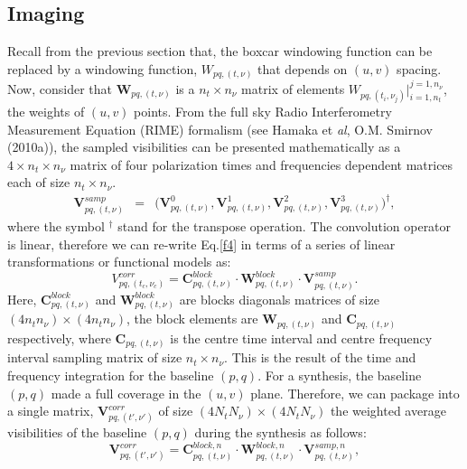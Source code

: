 \documentclass[useAMS,usenatbib]{mn2e}
\begin{document}
\subsection{Imaging}
\label{sec:imaging}
Recall from the previous section that, the boxcar windowing function can be replaced by a windowing function, $W_{pq,(t,\nu)}$ that depends 
on $(u,v)$ spacing. Now, consider that $\mathcal{\textbf{W}}_{pq,(t,\nu)}$ is a $n_t \times n_{\nu}$ matrix of elements 
$W_{pq,(t_i,\nu_j)}|_{i=1,n_t}^{j=1, n_{\nu}}$, the weights of $(u,v)$ points. From the full sky Radio Interferometry Measurement Equation 
(RIME) formalism (see Hamaka et \textit{al}, O.M. Smirnov (2010a)), the sampled visibilities can be presented mathematically as a $4\times 
n_t\times n_{\nu}$ matrix of four polarization times and 
frequencies dependent matrices each of size $n_t\times n_{\nu}$.
\begin{eqnarray*}
\mathbf{V}_{pq,(t,\nu)}^{samp}&=&\Bigg(\mathbf{V}_{pq,(t,\nu)}^{0},\mathbf { V } 
^1_{pq,(t,\nu)},\mathbf{V}^2_{pq,(t,\nu)},\mathbf{V}_{pq,(t,\nu)}^{3 } \Bigg)^{\dagger}, \label{eqx:conv}
\end{eqnarray*}
where the symbol $^{\dagger}$ stand for the transpose operation. The convolution operator is linear, therefore we can re-write Eq.\ref{f4} 
in terms of a series of linear transformations or functional models as:
\begin{equation}
V_{pq,(t_c,\nu_c)}^{corr}= \mathbf{C}_{pq,(t,\nu)}^{block}\cdot\mathbf{W}_{pq,(t,\nu)}^{block}\cdot 
\mathbf{V}_{pq,(t,\nu)}^{samp}.\label{eqbb:linear}
\end{equation}
Here, $\mathbf{C}_{pq,(t,\nu)}^{block}$ and $\mathbf{W}_{pq,(t,\nu)}^{block}$ are  blocks diagonals matrices of size $(4n_t 
n_{\nu})\times(4n_t n_{\nu})$, the block elements are $\mathcal{\textbf{W}}_{pq,(t,\nu)}$ and $\mathbf{C}_{pq,(t,\nu)}$ 
respectively, where $\mathbf{C}_{pq,(t,\nu)}$ is the centre time interval and centre frequency interval sampling matrix of size $n_t\times 
n_{\nu}$. This
is the result of the time and frequency integration for the baseline $(p,q)$.
For a synthesis, the baseline $(p,q)$ made a full coverage in the $(u,v)$ plane. Therefore, we can  
package into a single matrix, $\mathbf{V}_{pq,(t',\nu')}^{corr}$ of size $(4N_t N_{\nu})\times (4N_t N_{\nu})$ the 
weighted average visibilities of the  baseline $(p,q)$ during the synthesis as follows: 
\begin{equation}
\mathbf{V}_{pq,(t',\nu')}^{corr}=\mathbf{C}_{pq,(t,\nu)}^{block,n}\cdot 
\mathbf{W}_{pq,(t,\nu)}^{block,n}\cdot\mathbf{V}_{pq,(t,\nu)}^{samp,n},\label{eq2:block}
\end{equation}
\end{document}
